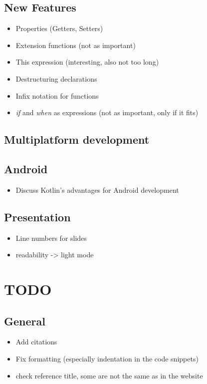 \documentclass[a4paper,11pt]{article}
\begin{document}
  \subsection{New Features}
    \begin{itemize}
      \item Properties (Getters, Setters)
      \item Extension functions (not as important)
      \item This expression (interesting, also not too long)
      \item Destructuring declarations
      \item Infix notation for functions
      \item \textit{if} and \textit{when} as expressions (not as important, only if it fits)
    \end{itemize}

  \subsection{Multiplatform development}
  
  \subsection{Android}
    \begin{itemize}
      \item Discuss Kotlin's advantages for Android development
    \end{itemize}

  \subsection{Presentation}
  \begin{itemize}
    \item Line numbers for slides
    \item readability -> light mode
  \end{itemize}












\newpage
\section{TODO}

  \subsection{General}
    \begin{itemize}
      \item Add citations
      \item Fix formatting (especially indentation in the code snippets)
      \item check reference title, some are not the same as in the website
    \end{itemize}
    
\end{document}
